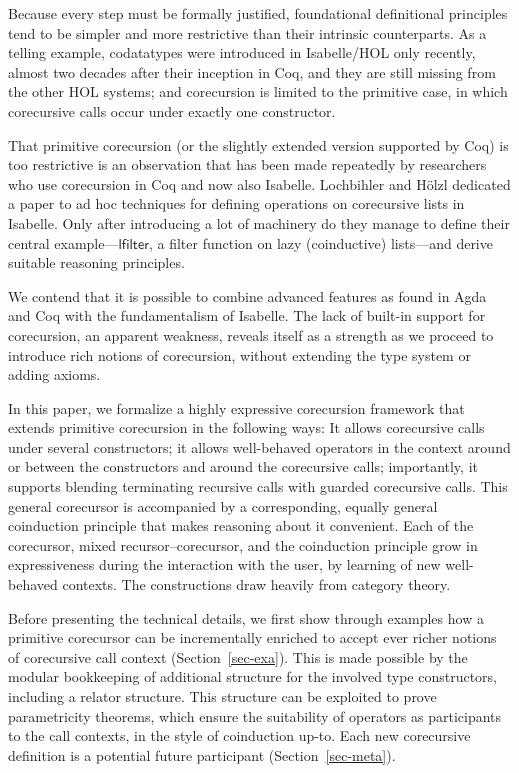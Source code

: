 \documentclass[preprint,draft]
{sigplanconf}
\newcommand\TC{\mathsf}
\newcommand{\<}{\langle}
\renewcommand{\>}{\rangle}
\newcommand\const[1]{{\ensuremath{\TC{#1}}}}
\def\S{Section~}
\begin{document}
Because every step must be formally justified, foundational definitional
principles tend to be simpler and more restrictive than their intrinsic
counterparts. As a telling example, codatatypes were introduced in
Isabelle\slash HOL only recently, almost two decades after their inception in
Coq, and they are still missing from the other HOL systems; and corecursion is
limited to the primitive case, in which corecursive calls occur under exactly
one constructor.

That primitive corecursion (or the slightly extended version supported by Coq)
is too restrictive is an observation that has been made repeatedly by
researchers who use corecursion in Coq and now also Isabelle.
Lochbihler and H\"olzl dedicated a paper \cite{lochbihler-hoelzl-2014}
to ad hoc techniques for defining operations on corecursive lists in Isabelle.
Only after introducing a lot of machinery do they manage to
define their central example---\const{lfilter}, a filter function
on lazy (coinductive) lists---and derive suitable reasoning principles.

We contend that it is possible to combine advanced features as found in
Agda and Coq with the fundamentalism of Isabelle.
The lack of built-in support for corecursion, an apparent weakness, reveals
itself as a strength as we proceed to introduce rich notions of corecursion,
without extending the type system or adding axioms.


In this paper, we formalize a highly expressive corecursion framework that extends primitive
corecursion in the following ways:
It allows corecursive calls under several constructors;
it allows well-behaved operators in the context around or
between the constructors and around the corecursive calls;
importantly, it supports blending terminating recursive calls with guarded corecursive calls.
This general corecursor is accompanied by a corresponding, equally general
coinduction principle that makes reasoning about it convenient. Each of the
corecursor, mixed recursor--corecursor, and the coinduction principle
{\relax grow in expressiveness
during the interaction with the user}, by learning of new well-behaved contexts.
The constructions draw heavily from category theory.

Before presenting the technical details, we first show through examples how a
primitive corecursor can be incrementally enriched to accept ever richer
notions of corecursive call context (\S\ref{sec-exa}). This is made possible by
the modular bookkeeping of additional structure for the involved type constructors,
including a relator structure. This structure can be exploited
to prove parametricity theorems, which ensure the suitability of operators as participants to the call contexts, in the style
of coinduction up-to. Each new corecursive definition is a
potential future participant (\S\ref{sec-meta}).
\end{document}
